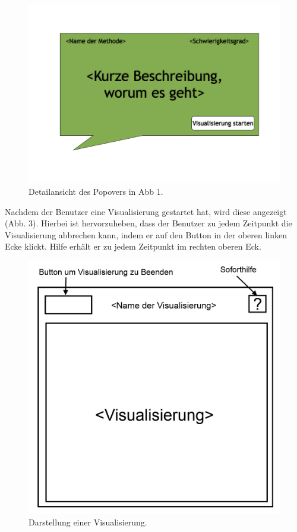 \documentclass{article}
\begin{document}
\begin{figure}[H]
  \centering
    \includegraphics[width=\textwidth]{resources/ui_walkthrough_popover-draft}
  \caption{Detailansicht des Popovers in Abb 1.}
\end{figure}

Nachdem der Benutzer eine Visualisierung gestartet hat, wird diese angezeigt (Abb. 3). Hierbei ist hervorzuheben, dass der Benutzer zu jedem Zeitpunkt die Visualisierung abbrechen kann, indem er auf den Button in der oberen linken Ecke klickt. Hilfe erhält er zu jedem Zeitpunkt im rechten oberen Eck.

\begin{figure}[H]
  \centering
    \includegraphics[width=\textwidth]{resources/ui_walkthrough_visualisation-draft}
  \caption{Darstellung einer Visualisierung.}
\end{figure}
\end{document}
